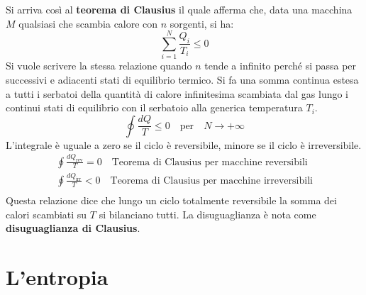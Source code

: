 \documentclass[10pt,a4paper]{book}
\begin{document}
\begin{figure}[htpb]
\end{figure}
\FloatBarrier
Si arriva così al \textbf{teorema di Clausius} il quale afferma che, data una macchina $M$ qualsiasi che scambia calore con $n$ sorgenti, si ha:
\[
	\sum_{i=1}^N \frac{Q_i }{T_i } \le 0
\]
Si vuole scrivere la stessa relazione quando $n$ tende a infinito perché si passa per successivi e adiacenti stati di equilibrio termico. Si fa una somma continua estesa a tutti i serbatoi della quantità di calore infinitesima scambiata dal gas lungo i continui stati di equilibrio con il serbatoio alla generica temperatura $T_i$.
\[
	\oint \frac{dQ}{T} \le 0 \quad \text{per} \quad N\to +\infty
\]
L'integrale è uguale a zero se il ciclo è reversibile, minore se il ciclo è irreversibile.
\begin{gather*}
	\oint \frac{dQ_{\text{rev} } }{T} = 0 \quad \text{Teorema di Clausius per macchine reversibili} \\
	\oint \frac{dQ_{\text{irr} } }{T} < 0 \quad \text{Teorema di Clausius per macchine irreversibili} \\
\end{gather*}
Questa relazione dice che lungo un ciclo totalmente reversibile la somma dei calori scambiati su $T$ si bilanciano tutti. La disuguaglianza è nota come \textbf{disuguaglianza di Clausius}.







































\section{L'entropia}
\end{document}
